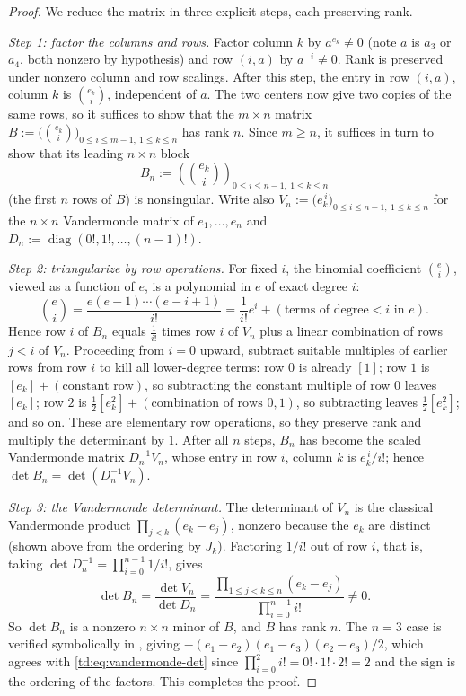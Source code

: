 \documentclass[a4paper,11pt]{article}
\newcommand{\filename}[1]{\texttt{\seqsplit{#1}}}
\theoremstyle{plain}
\theoremstyle{definition}
\theoremstyle{remark}
\begin{document}
\begin{proof}
We reduce the matrix in three explicit steps, each preserving rank.

\emph{Step 1: factor the columns and rows.} Factor column $k$ by $a^{e_k} \neq 0$ (note $a$
is $a_3$ or $a_4$, both nonzero by hypothesis) and row $(i, a)$ by $a^{-i} \neq 0$. Rank is
preserved under nonzero column and row scalings. After this step, the entry in row
$(i, a)$, column $k$ is $\binom{e_k}{i}$, independent of $a$. The two centers now give two
copies of the same rows, so it suffices to show that the $m \times n$ matrix
$B := \bigl(\binom{e_k}{i}\bigr)_{0 \leq i \leq m-1,\ 1 \leq k \leq n}$ has rank $n$. Since
$m \geq n$, it suffices in turn to show that its leading $n \times n$ block
\[
B_n := \left(\binom{e_k}{i}\right)_{0 \leq i \leq n-1,\ 1 \leq k \leq n}
\]
(the first $n$ rows of $B$) is nonsingular. Write also
$V_n := \bigl(e_k^{\,i}\bigr)_{0 \leq i \leq n-1,\ 1 \leq k \leq n}$ for the $n \times n$
Vandermonde matrix of $e_1, \dots, e_n$ and
$D_n := \operatorname{diag}(0!, 1!, \dots, (n-1)!)$.

\emph{Step 2: triangularize by row operations.} For fixed $i$, the binomial coefficient
$\binom{e}{i}$, viewed as a function of $e$, is a polynomial in $e$ of exact degree $i$:
\[
\binom{e}{i} = \frac{e (e-1) \cdots (e - i + 1)}{i!}
= \frac{1}{i!} e^i + (\text{terms of degree} < i \text{ in } e).
\]
Hence row $i$ of $B_n$ equals $\frac{1}{i!}$ times row $i$ of $V_n$ plus a linear
combination of rows $j < i$ of $V_n$. Proceeding from
$i = 0$ upward, subtract suitable multiples of earlier rows from row $i$ to kill all
lower-degree terms: row $0$ is already $[1]$; row $1$ is $[e_k] + (\text{constant row})$,
so subtracting the constant multiple of row $0$ leaves $[e_k]$; row $2$ is
$\frac{1}{2}[e_k^2] + (\text{combination of rows } 0, 1)$, so subtracting leaves
$\frac{1}{2}[e_k^2]$; and so on. These are elementary row operations, so they preserve rank
and multiply the determinant by $1$. After all $n$ steps, $B_n$ has become the scaled
Vandermonde matrix $D_n^{-1} V_n$, whose entry in row $i$, column $k$ is $e_k^{\,i}/i!$;
hence $\det B_n = \det(D_n^{-1} V_n)$.

\emph{Step 3: the Vandermonde determinant.} The determinant of $V_n$ is the classical
Vandermonde product $\prod_{j < k} (e_k - e_j)$, nonzero because the $e_k$ are distinct
(shown above from the ordering by $J_k$). Factoring $1/i!$ out of row $i$, that is, taking
$\det D_n^{-1} = \prod_{i=0}^{n-1} 1/i!$, gives
\begin{equation}\label{td:eq:vandermonde-det}
\det B_n = \frac{\det V_n}{\det D_n}
= \frac{\prod_{1 \leq j < k \leq n}(e_k - e_j)}{\prod_{i=0}^{n-1} i!} \neq 0.
\end{equation}
So $\det B_n$ is a nonzero $n \times n$ minor of $B$, and $B$ has rank $n$. The $n = 3$ case is verified
symbolically in \filename{m1\_block\_rank.py}, giving
$-(e_1-e_2)(e_1-e_3)(e_2-e_3)/2$, which agrees with \eqref{td:eq:vandermonde-det} since
$\prod_{i=0}^{2} i! = 0! \cdot 1! \cdot 2! = 2$ and the sign is the ordering of the factors.
This completes the proof.
\end{proof}
\end{document}
